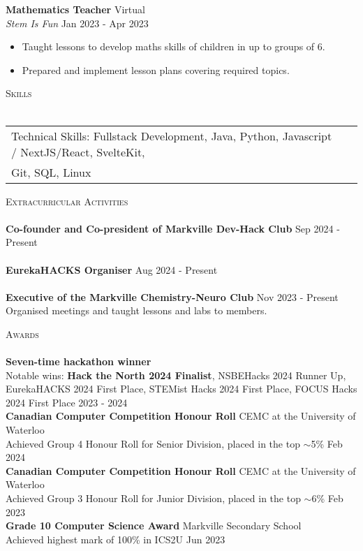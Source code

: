 \documentclass[a4paper,11pt,oneside,final]{article}
\newcommand{\lineunder} {
    \vspace*{-8pt} \\
    \hspace*{-18pt} \hrulefill \\
}
\newcommand{\header} [1] {
    {\hspace*{-18pt}\vspace*{6pt} \textsc{#1}}
    \vspace*{-6pt} \lineunder
}
\begin{document}
\vspace{1mm}

\textbf{Mathematics Teacher} \hfill Virtual\\
\textit{Stem Is Fun} \hfill Jan 2023 - Apr 2023\\
\vspace{-1mm}
\begin{itemize} \itemsep 1pt
	\item Taught lessons to develop maths skills of children in up to groups of 6.
	\item Prepared and implement lesson plans covering required topics.
\end{itemize}

\header{Skills}
\begin{tabular}{ l l }
	Technical Skills: Fullstack Development, Java, Python, Javascript / NextJS/React, SvelteKit,\\ Git, SQL, Linux\\
\end{tabular}
\vspace{4mm}

\header{Extracurricular Activities}
{\textbf{Co-founder and Co-president of Markville  Dev-Hack Club}} \hfill Sep 2024 - Present\\
\ \\
\vspace*{2mm}
{\textbf{EurekaHACKS Organiser}} \hfill Aug 2024 - Present\\
\ \\
\vspace*{2mm}
{\textbf{Executive of the Markville Chemistry-Neuro Club}} \hfill Nov 2023 - Present\\
Organised meetings and taught lessons and labs to members.\\
\vspace*{2mm}
\vspace*{4mm}

\header{Awards}
\textbf{Seven-time hackathon winner} \hfill \\
Notable wins: \textbf{Hack the North 2024 Finalist}, NSBEHacks 2024 Runner Up, EurekaHACKS 2024 First Place, STEMist Hacks 2024 First Place, FOCUS Hacks 2024 First Place
\vspace*{4mm}
\hfill 2023 - 2024\\
\textbf{Canadian Computer Competition Honour Roll} \hfill CEMC at the University of Waterloo\\
Achieved Group 4 Honour Roll for Senior Division, placed in the top $\sim$5\% \hfill Feb 2024\\
\vspace*{4mm}
\textbf{Canadian Computer Competition Honour Roll} \hfill CEMC at the University of Waterloo\\
Achieved Group 3 Honour Roll for Junior Division, placed in the top $\sim$6\%  \hfill Feb 2023\\
\vspace*{4mm}
\textbf{Grade 10 Computer Science Award} \hfill Markville Secondary School\\
Achieved highest mark of 100\% in ICS2U \hfill Jun 2023\\
\vspace*{2mm}

\ 
\end{document}
